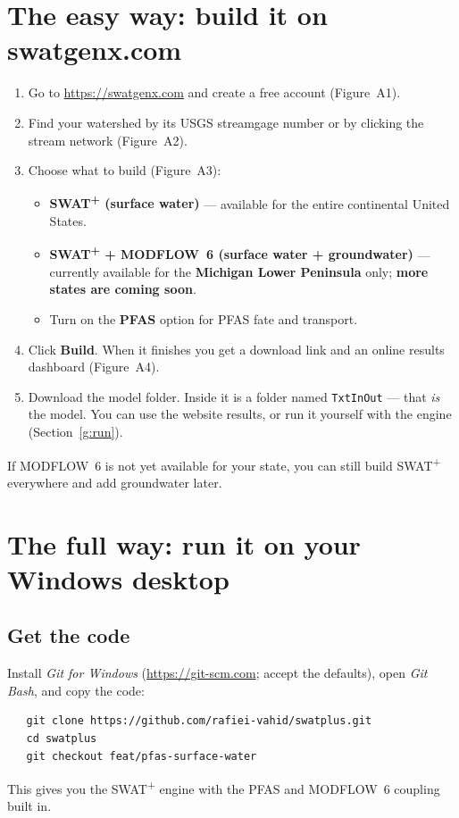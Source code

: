 \documentclass[12pt]{article}
\begin{document}
\section{The easy way: build it on swatgenx.com}\label{g:web}
\begin{enumerate}
  \item Go to \url{https://swatgenx.com} and create a free account (Figure~A1).
  \item Find your watershed by its USGS streamgage number or by clicking the
        stream network (Figure~A2).
  \item Choose what to build (Figure~A3):
    \begin{itemize}
      \item \textbf{SWAT\textsuperscript{+} (surface water)} --- available for the
            entire continental United States.
      \item \textbf{SWAT\textsuperscript{+} + MODFLOW~6 (surface water +
            groundwater)} --- currently available for the \textbf{Michigan Lower
            Peninsula} only; \textbf{more states are coming soon}.
      \item Turn on the \textbf{PFAS} option for PFAS fate and transport.
    \end{itemize}
  \item Click \textbf{Build}. When it finishes you get a download link and an
        online results dashboard (Figure~A4).
  \item Download the model folder. Inside it is a folder named \texttt{TxtInOut}
        --- that \emph{is} the model. You can use the website results, or run it
        yourself with the engine (Section~\ref{g:run}).
\end{enumerate}
If MODFLOW~6 is not yet available for your state, you can still build
SWAT\textsuperscript{+} everywhere and add groundwater later.

\section{The full way: run it on your Windows desktop}\label{g:local}

\subsection{Get the code}
Install \emph{Git for Windows} (\url{https://git-scm.com}; accept the defaults),
open \emph{Git Bash}, and copy the code:
\begin{verbatim}
   git clone https://github.com/rafiei-vahid/swatplus.git
   cd swatplus
   git checkout feat/pfas-surface-water
\end{verbatim}
This gives you the SWAT\textsuperscript{+} engine with the PFAS and MODFLOW~6
coupling built in.
\end{document}

